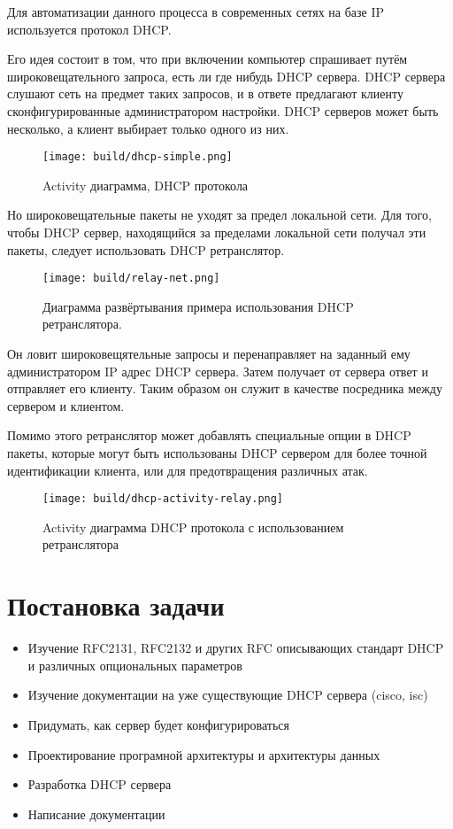 \documentclass[14pt,a4paper]{extarticle}
\begin{document}
Для автоматизации данного процесса в современных сетях на базе IP используется протокол DHCP.

Его идея состоит в том, что при включении компьютер спрашивает путём широковещательного запроса, есть ли где нибудь DHCP сервера.
DHCP сервера слушают сеть на предмет таких запросов, и в ответе предлагают клиенту сконфигурированные администратором настройки.
DHCP серверов может быть несколько, а клиент выбирает только одного из них.

\begin{figure}[H]
    \centering
    \texttt{[image: build/dhcp-simple.png]}
    \caption{Activity диаграмма, DHCP протокола}
\end{figure}

Но широковещательные пакеты не уходят за предел локальной сети.
Для того, чтобы DHCP сервер, находящийся за пределами локальной сети получал эти пакеты, следует использовать DHCP ретранслятор. \cite{rfc2131}

\begin{figure}[H]
    \centering
    \texttt{[image: build/relay-net.png]}
    \caption{Диаграмма развёртывания примера использования DHCP ретранслятора.}
\end{figure}

Он ловит широковещятельные запросы и перенаправляет на заданный ему администратором IP адрес DHCP сервера.
Затем получает от сервера ответ и отправляет его клиенту.
Таким образом он служит в качестве посредника между сервером и клиентом. \cite{rfc2131}

Помимо этого ретранслятор может добавлять специальные опции в DHCP пакеты, которые могут быть использованы DHCP сервером для более точной идентификации клиента, или для предотвращения различных атак. \cite{rfc3046}


\begin{figure}[H]
    \centering
    \texttt{[image: build/dhcp-activity-relay.png]}
    \caption{Activity диаграмма DHCP протокола с использованием ретранслятора}
\end{figure}

\section{Постановка задачи}

\begin{itemize}
    \item Изучение RFC2131, RFC2132 и других RFC описывающих стандарт DHCP и различных опциональных параметров
    \item Изучение документации на уже существующие DHCP сервера (cisco, isc)
    \item Придумать, как сервер будет конфигурироваться
    \item Проектирование програмной архитектуры и архитектуры данных
    \item Разработка DHCP сервера
    \item Написание документации
\end{itemize}
\end{document}
